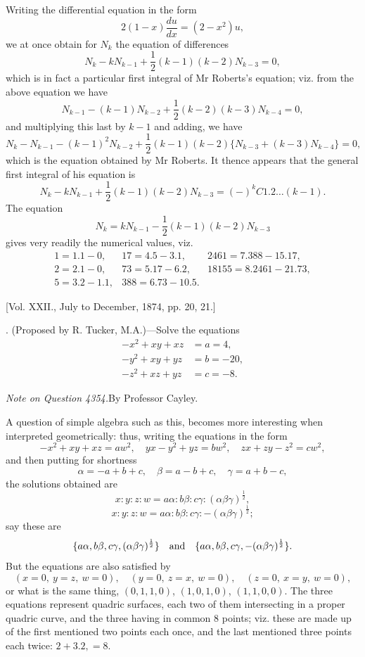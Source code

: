 \documentclass[10pt,twoside]{article}
\begin{document}
Writing the differential equation in the form
\[
2(1-x)\frac{du}{dx}=(2-x^2)u,
\]
we at once obtain for \(N_k\) the equation of differences
\[
N_k-kN_{k-1}+\frac{1}{2}(k-1)(k-2)N_{k-3}=0,
\]
which is in fact a particular first integral of Mr Roberts's equation; viz. from the above equation we have
\[
N_{k-1}-(k-1)N_{k-2}+\frac{1}{2}(k-2)(k-3)N_{k-4}=0,
\]
and multiplying this last by \(k-1\) and adding, we have
\[
N_k-N_{k-1}-(k-1)^2N_{k-2}
+\frac{1}{2}(k-1)(k-2)\{N_{k-3}+(k-3)N_{k-4}\}=0,
\]
which is the equation obtained by Mr Roberts. It thence appears that the general first integral of his equation is
\[
N_k-kN_{k-1}+\frac{1}{2}(k-1)(k-2)N_{k-3}=(-)^k C1.2\ldots(k-1).
\]
The equation
\[
N_k=kN_{k-1}-\frac{1}{2}(k-1)(k-2)N_{k-3}
\]
gives very readily the numerical values, viz.
\[
\begin{array}{lll}
1=1.1-0, & 17=4.5-3.1, & 2461=7.388-15.17,\\
2=2.1-0, & 73=5.17-6.2, & 18155=8.2461-21.73,\\
5=3.2-1.1, & 388=6.73-10.5.&
\end{array}
\]

\bigskip
\begin{center}
[Vol. XXII., July to December, 1874, pp. 20, 21.]
\end{center}

. (Proposed by R. Tucker, M.A.)---Solve the equations
\begin{align}
-x^2+xy+xz&=a=4, \tag{1}\\
-y^2+xy+yz&=b=-20, \tag{2}\\
-z^2+xz+yz&=c=-8. \tag{3}
\end{align}
\newpage

\begin{center}
\textit{Note on Question 4354.}\quad By Professor Cayley.
\end{center}

A question of simple algebra such as this, becomes more interesting when interpreted geometrically: thus, writing the equations in the form
\[
-x^2+xy+xz=aw^2,\quad yx-y^2+yz=bw^2,\quad zx+zy-z^2=cw^2,
\]
and then putting for shortness
\[
\alpha=-a+b+c,\quad \beta=a-b+c,\quad \gamma=a+b-c,
\]
the solutions obtained are
\[
x:y:z:w=a\alpha:b\beta:c\gamma:(\alpha\beta\gamma)^{\frac12},
\]
\[
x:y:z:w=a\alpha:b\beta:c\gamma:-(\alpha\beta\gamma)^{\frac12};
\]
say these are
\[
\{a\alpha,b\beta,c\gamma,(\alpha\beta\gamma)^{\frac12}\}
\quad\hbox{and}\quad
\{a\alpha,b\beta,c\gamma,-(\alpha\beta\gamma)^{\frac12}\}.
\]
But the equations are also satisfied by
\[
(x=0,\ y=z,\ w=0),\quad
(y=0,\ z=x,\ w=0),\quad
(z=0,\ x=y,\ w=0),
\]
or what is the same thing, \((0,1,1,0)\), \((1,0,1,0)\), \((1,1,0,0)\). The three equations represent quadric surfaces, each two of them intersecting in a proper quadric curve, and the three having in common 8 points; viz. these are made up of the first mentioned two points each once, and the last mentioned three points each twice: \(2+3.2,=8\).
\end{document}
